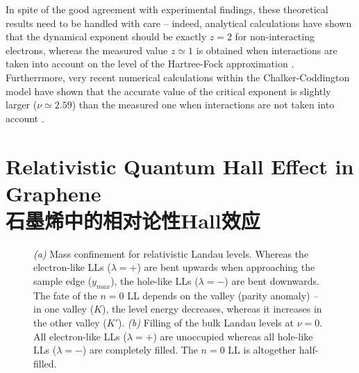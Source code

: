 \documentclass[10pt]{book}
\begin{document}
In spite of the good agreement with experimental findings, these theoretical
results need to be handled with care -- indeed, analytical calculations have shown that the dynamical exponent
should be exactly $z=2$ for non-interacting electrons, whereas the measured value $z\simeq 1$ is obtained when interactions are 
taken into account on the level of the Hartree-Fock approximation \cite{Huck}. Furtherrmore, very recent numerical calculations
within the Chalker-Coddington model have shown that the accurate value of the critical exponent is slightly larger 
($\nu\simeq 2.59$) than the measured one when interactions are not taken into account \cite{slevin}. 

\section[石墨烯中的相对论性Hall效应]{Relativistic Quantum Hall Effect in Graphene\\\bf 石墨烯中的相对论性Hall效应}
\label{relQHE}





\begin{figure}
\begin{center}
\end{center}
\caption{ {\sl (a)} Mass confinement for relativistic Landau levels. Whereas the electron-like LLs ($\lambda=+$) are bent upwards
when approaching the sample edge ($y_{max}$), the hole-like LLs ($\lambda=-$) are bent downwards. The fate of the $n=0$ LL
depends on the valley (parity anomaly) -- 
in one valley ($K$), the level energy decreases, whereas it increases in the other valley ($K'$). 
{\sl (b)} Filling of the bulk Landau levels at $\nu=0$. All electron-like LLs ($\lambda=+$) are unoccupied whereas
all hole-like LLs ($\lambda=-$) are completely filled. The $n=0$ LL is altogether half-filled.}
\label{fig17}
\end{figure}
\end{document}
